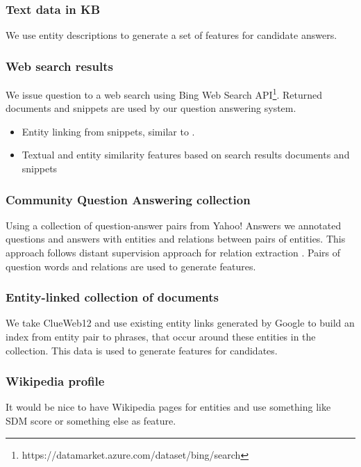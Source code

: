 \subsubsection{Text data in KB}
We use entity descriptions to generate a set of features for candidate answers.

\subsubsection{Web search results}
We issue question to a web search using Bing Web Search API\footnote{https://datamarket.azure.com/dataset/bing/search}.
Returned documents and snippets are used by our question answering system.

\begin{itemize}
\item Entity linking from snippets, similar to \cite{SMAPH_ERD:2014}.
\item Textual and entity similarity features based on search results documents and snippets
\end{itemize}

\subsubsection{Community Question Answering collection}
Using a collection of question-answer pairs from Yahoo! Answers we annotated questions and answers with entities and relations between pairs of entities.
This approach follows distant supervision approach for relation extraction \cite{savenkov-EtAl:2015:SRW}.
Pairs of question words and relations are used to generate features.

\subsubsection{Entity-linked collection of documents}
We take ClueWeb12 and use existing entity links generated by Google to build an index from entity pair to phrases, that occur around these entities in the collection.
This data is used to generate features for candidates.

\subsubsection{Wikipedia profile}
It would be nice to have Wikipedia pages for entities and use something like SDM score or something else as feature.